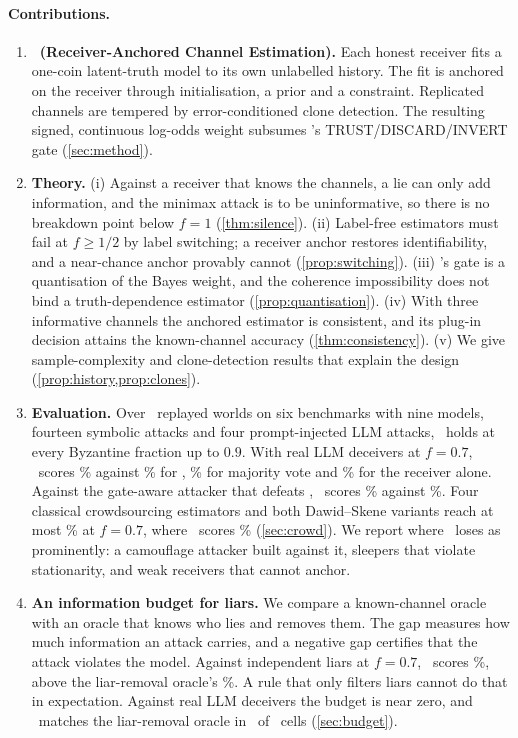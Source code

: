 \paragraph{Contributions.}
\begin{enumerate}
\item \textbf{\race\ (Receiver-Anchored Channel Estimation).} Each honest receiver fits a one-coin latent-truth model to its own unlabelled history. The fit is anchored on the receiver through initialisation, a prior and a constraint. Replicated channels are tempered by error-conditioned clone detection. The resulting signed, continuous log-odds weight subsumes \aip's TRUST/\allowbreak DISCARD/\allowbreak INVERT gate (\cref{sec:method}).
\item \textbf{Theory.} (i) Against a receiver that knows the channels, a lie can only add information, and the minimax attack is to be uninformative, so there is no breakdown point below $f=1$ (\cref{thm:silence}). (ii) Label-free estimators must fail at $f\ge1/2$ by label switching; a receiver anchor restores identifiability, and a near-chance anchor provably cannot (\cref{prop:switching}). (iii) \aip's gate is a quantisation of the Bayes weight, and the coherence impossibility does not bind a truth-dependence estimator (\cref{prop:quantisation}). (iv) With three informative channels the anchored estimator is consistent, and its plug-in decision attains the known-channel accuracy (\cref{thm:consistency}). (v) We give sample-complexity and clone-detection results that explain the design (\cref{prop:history,prop:clones}).
\item \textbf{Evaluation.} Over \nWorldsReplay\ replayed worlds on six benchmarks with nine models, fourteen symbolic attacks and four prompt-injected LLM attacks, \race\ holds at every Byzantine fraction up to $0.9$. With real LLM deceivers at $f=0.7$, \race\ scores \llmRaceSeven\% against \llmAipSeven\% for \aip, \llmMajSeven\% for majority vote and \llmSelfSeven\% for the receiver alone. Against the gate-aware attacker that defeats \aip, \race\ scores \zooGateRaceSeven\% against \zooGateAipSeven\%. Four classical crowdsourcing estimators and both Dawid--Skene variants reach at most \crowdClassicalMaxSeven\% at $f=0.7$, where \race\ scores \crowdRaceSeven\% (\cref{sec:crowd}). We report where \race\ loses as prominently: a camouflage attacker built against it, sleepers that violate stationarity, and weak receivers that cannot anchor.
\item \textbf{An information budget for liars.} We compare a known-channel oracle with an oracle that knows who lies and removes them. The gap measures how much information an attack carries, and a negative gap certifies that the attack violates the model. Against independent liars at $f=0.7$, \race\ scores \extRaceIndepSeven\%, above the liar-removal oracle's \extRemovalIndepSeven\%. A rule that only filters liars cannot do that in expectation. Against real LLM deceivers the budget is near zero, and \race\ matches the liar-removal oracle in \removalLlmTies\ of \removalLlmCells\ cells (\cref{sec:budget}).

\end{enumerate}
